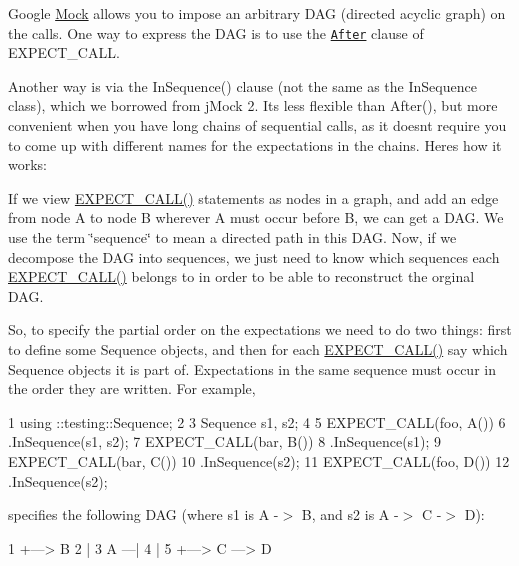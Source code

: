 Google \hyperlink{classMock}{Mock} allows you to impose an arbitrary D\+AG (directed acyclic graph) on the calls. One way to express the D\+AG is to use the \href{http://code.google.com/p/googlemock/wiki/V1_6_CheatSheet#The_After_Clause}{\tt After} clause of {\ttfamily E\+X\+P\+E\+C\+T\+\_\+\+C\+A\+LL}.

Another way is via the {\ttfamily In\+Sequence()} clause (not the same as the {\ttfamily In\+Sequence} class), which we borrowed from j\+Mock 2. It\textquotesingle{}s less flexible than {\ttfamily After()}, but more convenient when you have long chains of sequential calls, as it doesn\textquotesingle{}t require you to come up with different names for the expectations in the chains. Here\textquotesingle{}s how it works\+:

If we view {\ttfamily \hyperlink{gmock-spec-builders_8h_a535a6156de72c1a2e25a127e38ee5232}{E\+X\+P\+E\+C\+T\+\_\+\+C\+A\+L\+L()}} statements as nodes in a graph, and add an edge from node A to node B wherever A must occur before B, we can get a D\+AG. We use the term \char`\"{}sequence\char`\"{} to mean a directed path in this D\+AG. Now, if we decompose the D\+AG into sequences, we just need to know which sequences each {\ttfamily \hyperlink{gmock-spec-builders_8h_a535a6156de72c1a2e25a127e38ee5232}{E\+X\+P\+E\+C\+T\+\_\+\+C\+A\+L\+L()}} belongs to in order to be able to reconstruct the orginal D\+AG.

So, to specify the partial order on the expectations we need to do two things\+: first to define some {\ttfamily Sequence} objects, and then for each {\ttfamily \hyperlink{gmock-spec-builders_8h_a535a6156de72c1a2e25a127e38ee5232}{E\+X\+P\+E\+C\+T\+\_\+\+C\+A\+L\+L()}} say which {\ttfamily Sequence} objects it is part of. Expectations in the same sequence must occur in the order they are written. For example,


\begin{DoxyCode}
1 using ::testing::Sequence;
2 
3 Sequence s1, s2;
4 
5 EXPECT\_CALL(foo, A())
6     .InSequence(s1, s2);
7 EXPECT\_CALL(bar, B())
8     .InSequence(s1);
9 EXPECT\_CALL(bar, C())
10     .InSequence(s2);
11 EXPECT\_CALL(foo, D())
12     .InSequence(s2);
\end{DoxyCode}


specifies the following D\+AG (where {\ttfamily s1} is {\ttfamily A -\/$>$ B}, and {\ttfamily s2} is {\ttfamily A -\/$>$ C -\/$>$ D})\+:


\begin{DoxyCode}
1      +---> B
2      |
3 A ---|
4      |
5      +---> C ---> D
\end{DoxyCode}


